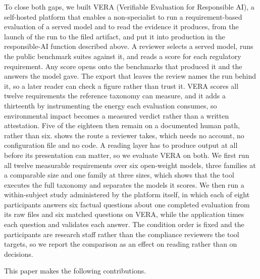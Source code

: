 \documentclass[10pt,conference]{IEEEtran}
\begin{document}
To close both gaps, we built VERA (Verifiable Evaluation for Responsible AI), a self-hosted platform that enables a non-specialist to run a requirement-based evaluation of a served model and to read the evidence it produces, from the launch of the run to the filed artifact, and put it into production in the responsible-AI function described above.
A reviewer selects a served model, runs the public benchmark suites against it, and reads a score for each regulatory requirement.
Any score opens onto the benchmarks that produced it and the answers the model gave.
The export that leaves the review names the run behind it, so a later reader can check a figure rather than trust it.
VERA scores all twelve requirements the reference taxonomy can measure, and it adds a thirteenth by instrumenting the energy each evaluation consumes, so environmental impact becomes a measured verdict rather than a written attestation.
Five of the eighteen then remain on a documented human path, rather than six.
 shows the route a reviewer takes, which needs no account, no configuration file and no code.
A reading layer has to produce output at all before its presentation can matter, so we evaluate VERA on both.
We first run all twelve measurable requirements over six open-weight models, three families at a comparable size and one family at three sizes, which shows that the tool executes the full taxonomy and separates the models it scores.
We then run a within-subject study administered by the platform itself, in which each of eight participants answers six factual questions about one completed evaluation from its raw files and six matched questions on VERA, while the application times each question and validates each answer.
The condition order is fixed and the participants are research staff rather than the compliance reviewers the tool targets, so we report the comparison as an effect on reading rather than on decisions.

This paper makes the following contributions.
\end{document}
